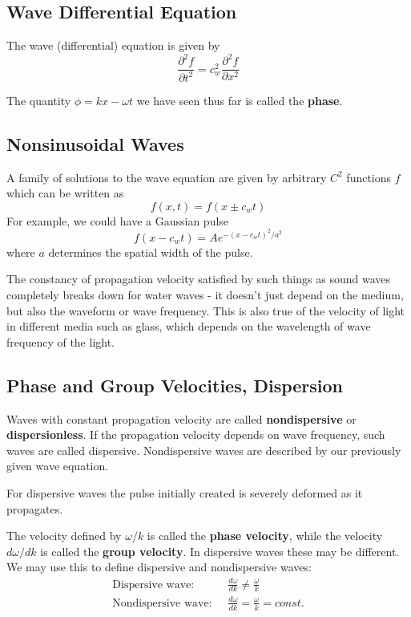 \documentclass[12pt, a4paper, oneside, openright, titlepage]{book}
\begin{document}
\subsection{Wave Differential Equation}

The wave (differential) equation is given by
\begin{equation}
    \frac{\partial^2 f}{\partial t^2} = c_w^2\frac{\partial^2 f}{\partial x^2}
\end{equation}

The quantity $\phi = kx-\omega t$ we have seen thus far is called the \textbf{phase}.


\subsection{Nonsinusoidal Waves}

A family of solutions to the wave equation are given by arbitrary $C^2$ functions $f$ which can be written as 
\begin{equation}
    f(x,t) = f(x\pm c_wt)
\end{equation}
For example, we could have a Gaussian pulse
\begin{equation}
    f(x-c_wt) = Ae^{-(x-c_wt)^2/a^2}
\end{equation}
where $a$ determines the spatial width of the pulse.


The constancy of propagation velocity satisfied by such things as sound waves completely breaks down for water waves - it doesn't just depend on the medium, but also the waveform or wave frequency. This is also true of the velocity of light in different media such as glass, which depends on the wavelength of wave frequency of the light.


\subsection{Phase and Group Velocities, Dispersion}

Waves with constant propagation velocity are called \textbf{nondispersive} or \textbf{dispersionless}. If the propagation velocity depends on wave frequency, such waves are called dispersive. Nondispersive waves are described by our previously given wave equation. 

For dispersive waves the pulse initially created is severely deformed as it propagates.

The velocity defined by $\omega/k$ is called the \textbf{phase velocity}, while the velocity $d\omega/dk$ is called the \textbf{group velocity}. In dispersive waves these may be different. We may use this to define dispersive and nondispersive waves:
\begin{align*}
    \text{Dispersive wave: }&\;\frac{d\omega}{dk}\neq \frac{\omega}{k} \\
    \text{Nondispersive wave: }&\;\frac{d\omega}{dk} = \frac{\omega}{k} = const.
\end{align*}
\end{document}
